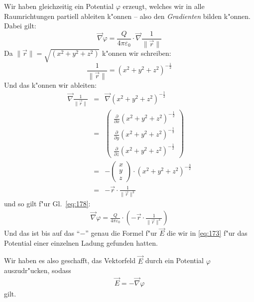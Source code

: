 Wir haben gleichzeitig ein Potential $\varphi$ erzeugt, welches wir in
alle Raumrichtungen partiell ableiten k"onnen -- also den
\emph{Gradienten} bilden k"onnen. Dabei gilt:
\begin{equation}
   \label{eq:178}
  \vec \nabla \varphi = \frac{Q}{4\pi\varepsilon_0} \cdot \vec \nabla \frac{1}{\|\vec r\|}
\end{equation}
Da $\|\vec r\| = \sqrt{(x^2 + y^2 + z^2)}$ k"onnen wir schreiben:
$$
\frac{1}{\|\vec r\|} = (x^2 + y^2 + z^2)^{-\frac{1}{2}}
$$
Und das k"onnen wir ableiten:
\begin{eqnarray*}
   \label{eq:179}
\vec \nabla \frac{1}{\|\vec r\|} &=& \vec \nabla (x^2 + y^2 +
z^2)^{-\frac{1}{2}} \\
&=&
\begin{pmatrix}
   \frac{\partial }{\partial x} (x^2 + y^2 + z^2)^{-\frac{1}{2}}\\
   \frac{\partial }{\partial y} (x^2 + y^2 + z^2)^{-\frac{1}{2}}\\
   \frac{\partial }{\partial z} (x^2 + y^2 + z^2)^{-\frac{1}{2}}
\end{pmatrix} \\
&=&
 - \begin{pmatrix}
  x\\y\\z
\end{pmatrix} \cdot (x^2 + y^2 + z^2)^{-\frac{3}{2}}   \\
&=&
- \vec r \cdot \frac{1}{\|\vec r\|^3}
\end{eqnarray*}
und so gilt f"ur Gl.~\eqref{eq:178}:
\begin{eqnarray}
   \label{eq:180}
   \vec \nabla \varphi = \frac{Q}{4\pi\varepsilon_0} \cdot \left ( - \vec r \cdot \frac{1}{\|\vec r\|^3} \right )
\end{eqnarray}
Und das ist bis auf das "`$-$"' genau die Formel f"ur $\vec E$ die wir
in \eqref{eq:173} f"ur das Potential einer einzelnen Ladung gefunden
hatten.

Wir haben es also geschafft, das Vektorfeld $\vec E$ durch ein
Potential $\varphi$ auszudr"ucken, sodass
\begin{eqnarray}
   \label{eqn_e_phi}
\boxed{   \vec E = - \vec \nabla \varphi   }
\end{eqnarray}
gilt. %


